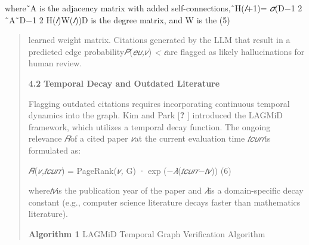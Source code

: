 \documentclass[
]{article}
\begin{document}
where˜A is the adjacency matrix with added
self-connections,˜H(\emph{𝑙}+1)= \emph{𝜎}(︂D−1 2 ˜A˜D−1 2
H(\emph{𝑙})W(\emph{𝑙}))︂D is the degree matrix, and W is the (5)

\begin{quote}
learned weight matrix. Citations generated by the LLM that result in a
predicted edge probability\emph{𝑃}(\emph{𝑒𝑢,𝑣}) \emph{\textless{} 𝜖}are
flagged as likely hallucinations for human review.

\textbf{4.2} \textbf{Temporal Decay and Outdated Literature}

Flagging outdated citations requires incorporating continuous temporal
dynamics into the graph. Kim and Park {[}\textbf{?} {]} introduced the
LAGMiD framework, which utilizes a temporal decay function. The ongoing
relevance \emph{𝑅}of a cited paper \emph{𝑣}at the current evaluation
time \emph{𝑡𝑐𝑢𝑟𝑟}is formulated as:

\emph{𝑅}(\emph{𝑣,𝑡𝑐𝑢𝑟𝑟}) = PageRank(\emph{𝑣,} G) · exp
(−\emph{𝜆}(\emph{𝑡𝑐𝑢𝑟𝑟}−\emph{𝑡𝑣})) (6)

where\emph{𝑡𝑣}is the publication year of the paper and \emph{𝜆}is a
domain-specific decay constant (e.g., computer science literature decays
faster than mathematics literature).

\textbf{Algorithm 1} LAGMiD Temporal Graph Verification Algorithm
\end{quote}
\end{document}
